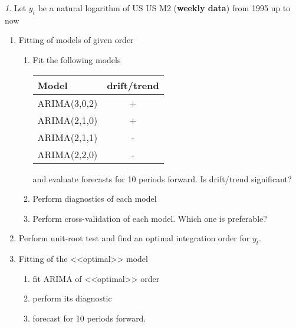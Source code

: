 \documentclass[12pt]{article}
\theoremstyle{remark}
\newtheorem{exercise}{}[section]
\begin{document}
\begin{exercise}
Let \(y_t\) be a natural logarithm of  US US M2 (\textbf{weekly data}) from 1995 up to now
\begin{enumerate}
	\item Fitting of models of given order
	\begin{enumerate}
		\item Fit the following models
		\begin{center}\small
			\begin{tabular}{l|c}
				Model & drift/trend \\ \hline
				ARIMA(3,0,2) & + \\
				ARIMA(2,1,0) & + \\
				ARIMA(2,1,1) & - \\
				ARIMA(2,2,0) & - \\ \hline
			\end{tabular}
		\end{center} 
		and evaluate forecasts for 10 periods forward. Is drift/trend significant?
		\item Perform diagnostics of each model
		\item Perform cross-validation of each model. Which one is preferable?
	\end{enumerate}
	\item Perform unit-root test and find an optimal integration order for  \(y_t\). 
	\item Fitting of the <<optimal>> model
	\begin{enumerate}
		\item fit ARIMA of <<optimal>> order
		\item perform its diagnostic
		\item forecast for 10 periods forward.
	\end{enumerate}
\end{enumerate}
\end{exercise}
\end{document}
